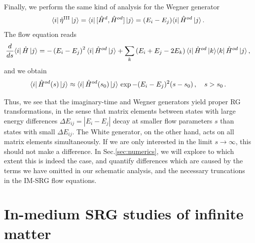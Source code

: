 Finally, we perform the same kind of analysis for the Wegner generator
\begin{equation}
  \langle{i}|\,{\hat{\eta}^\text{III}}\,|{j}\rangle=\langle{i}|\,{[{\hat{H}^d},{\hat{H}^{od}}]}\,|{j}\rangle=(E_i-E_j)\langle{i}|\,{\hat{H}^{od}}\,|{j}\rangle\,.
\end{equation}
The flow equation reads
\begin{align}
  \totd{}{s}\matrixe{i}{\hat{H}}{j}
  =-\left(E_i-E_j\right)^2\matrixe{i}{\hat{H}^{od}}{j}
  +\sum_k\left(E_i+E_j-2E_k\right)\matrixe{i}{\hat{H}^{od}}{k}\matrixe{k}{\hat{H}^{od}}{j}\,,\label{eq:schema_wegner}
\end{align}
and we obtain
\begin{equation}
  \langle{i}|\,{\hat{H}^{od}(s)}\,|{j}\rangle \approx \langle{i}|\,{\hat{H}^{od}(s_0)}\,|{j}\rangle\,\exp{-(E_i-E_j)^2 (s-s_0)}\,, \quad s>s_0\,.
\end{equation}

Thus, we see that the imaginary-time and Wegner generators yield
proper RG transformations, in the sense that matrix elements between
states with large energy differences $\Delta E_{ij} = |E_i-E_j|$ decay
at smaller flow parameters $s$ than states with small $\Delta
E_{ij}$. The White generator, on the other hand, acts on all matrix
elements simultaneously. If we are only interested in the limit
$s\to\infty$, this should not make a difference. In
Sec.\ref{sec:numerics}, we will explore to which extent this is indeed
the case, and quantify differences which are caused by the terms we
have omitted in our schematic analysis, and the necessary truncations
in the IM-SRG flow equations.


\section{In-medium SRG studies of infinite matter}

\begin{acknowledgement}

\end{acknowledgement}


















 
